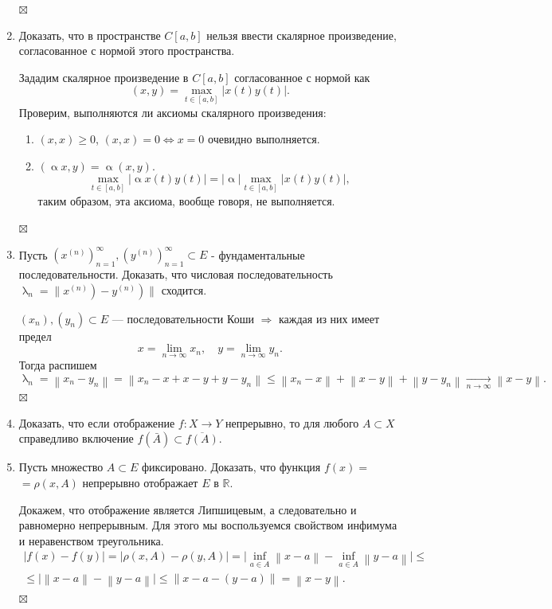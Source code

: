 \documentclass[a4paper, 12pt]{report}
\newenvironment{Proof} %
{\par\noindent{$\blacklozenge$}} %
{\hfill$\scriptstyle\boxtimes$}
\renewcommand{\leq}{\leqslant}
\renewcommand{\geq}{\geqslant}
\renewcommand{\alpha}{\upalpha}
\renewcommand{\lambda}{\uplambda}
\newcommand\Norm[1]{\left\| #1 \right\|}
\begin{document}
\begin{enumerate}
\begin{Proof}
		\end{Proof}
		\item Доказать, что в пространстве $C[a, b]$ нельзя ввести скалярное произведение, согласованное с нормой этого пространства. \begin{Proof}
			Зададим скалярное произведение в $C[a,b]$ согласованное с нормой как $$(x,y) = \underset{t \in [a,b]}{\max}|x(t) y(t)|.$$
		Проверим, выполняются ли аксиомы скалярного произведения:\begin{enumerate}
			\item $(x,x) \geq 0$, $(x,x) = 0\Longleftrightarrow x=0$ очевидно выполняется.
			\item $(\alpha x,y) = \alpha(x,y)$.
			$$\underset{t \in [a,b]}{\max}|\alpha x(t) {y(t)}| = |\alpha|\underset{t \in [a,b]}{\max}|x(t) {y(t)}|,$$
			таким образом, эта аксиома, вообще говоря, не выполняется.
		\end{enumerate}
		\end{Proof}
		\item Пусть $\left(x^{(n)}\right)_{n=1}^{\infty},\left(y^{(n)}\right)_{n=1}^{\infty} \subset E$ - фундаментальные последовательности. Доказать, что числовая последовательность $\left.\left.\lambda_{n}=\| x^{(n)}\right)-y^{(n)}\right) \|$ сходится.
		\begin{Proof}
			$(x_n), (y_n) \subset E$ --- последовательности Коши $\Rightarrow$ каждая из них имеет предел $$x = \lim\limits_{n\to \infty}x_n,\quad y = \lim\limits_{n\to \infty}y_n.$$
		Тогда распишем $$\lambda_n = \Norm{x_n - y_n} = \Norm{x_n - x + x - y + y - y_n} \leq \Norm{x_n - x} + \Norm{x-y} + \Norm{y -y_n} \xrightarrow[n\to\infty]{} \Norm{x - y}.$$
		\end{Proof}
		\item Доказать, что если отображение $f: X \rightarrow Y$ непрерывно, то для любого $A \subset X$ справедливо включение $f(\bar{A}) \subset \overline{f(A)}$.
		\item Пусть множество $A \subset E$ фиксировано. Доказать, что функция $f(x)=$ $=\rho(x, A)$ непрерывно отображает $E$ в $\mathbb{R}$. \begin{Proof}
			Докажем, что отображение является Липшицевым, а следовательно и равномерно непрерывным. Для этого мы воспользуемся свойством инфимума и неравенством треугольника.
		\begin{multline*}
			|f(x) - f(y)| =|\rho(x,A) - \rho (y,A)|= \Big|\inf_{a \in A}\Norm{x-a} - \inf_{a \in A}\Norm{y-a}\Big|\leq\\\leq \Big|\Norm{x-a} - \Norm{y-a}\Big|\leq \Norm{x - a - (y-a)} = \Norm{x-y}.

\end{multline*}
\end{Proof}
\end{enumerate}
\end{document}
